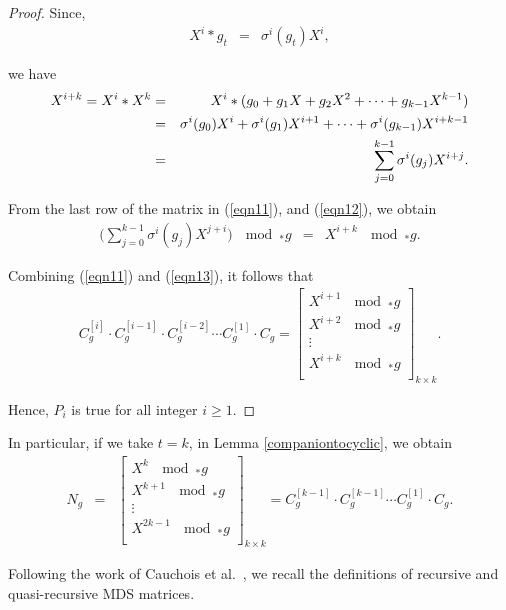 \documentclass[11pt]{article}
\begin{document}
\begin{proof}
	Since,
	\begin{eqnarray*}
		X^i*g_t&=&\sigma^i(g_t)X^i,
	\end{eqnarray*}
    
	we have
	\begin{eqnarray}\label{eqn12}
		X^{i+k}=X^i\ast X^k\notag&=& X^i*(g_0+g_1X+g_2X^2+\cdots+g_{k-1}X^{k-1})\\
\notag&=&\sigma^i(g_0)X^i+\sigma^i(g_1)X^{i+1}+\cdots+\sigma^i(g_{k-1})X^{i+k-1}\\
		&=&\sum_{j=0}^{k-1}\sigma^i (g_j)X^{i+j}.
	\end{eqnarray}
    
	From the last row of the matrix in (\ref{eqn11}), and (\ref{eqn12}), we obtain
	\begin{eqnarray}\label{eqn13}
		\Big(\sum_{j=0}^{k-1}\sigma^{i}(g_j)X^{j+i}\Big)~ \mod _*g  &=&X^{i+k}~ \mod _*g.
	\end{eqnarray}

Combining (\ref{eqn11}) and  (\ref{eqn13}), it follows that
	\begin{eqnarray}\label{eqn202}
		C_g^{[i]}\cdot 	C_g^{[i-1]}\cdot C_g^{[i-2]}\cdots C_g^{[1]}\cdot C_g=\begin{bmatrix}
			X^{i+1} ~ \mod _*g  \\
			X^{i+2} ~ \mod _*g  \\
			\vdots\\
			X^{i+k} ~ \mod _*g  \\
		\end{bmatrix}_{k\times k}.
	\end{eqnarray}
    
	Hence, $P_i$ is true for all integer $i\geq 1.$
\end{proof}

\noindent In particular, if we take $t=k$, in Lemma \ref{companiontocyclic}, we obtain
\begin{eqnarray}\label{eqn5.9-GR}
    N_g&=&\begin{bmatrix}
			X^{k} ~ \mod _*g  \\
			X^{k+1} ~ \mod _*g  \\
			\vdots\\
			X^{2k-1} ~ \mod _*g  \\
		\end{bmatrix}_{k\times k}=C^{[k-1]}_g\cdot C^{[k-1]}_g\cdots C^{[1]}_g\cdot C_g.\end{eqnarray}


Following the work of Cauchois et al.~\cite{Cauchois2016direct}, we recall the definitions of recursive and quasi-recursive MDS matrices.
\end{document}
